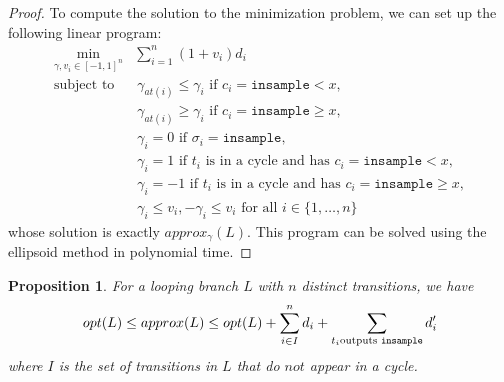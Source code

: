 \documentclass[12pt]{article}
\newcommand{\gguard}[1][x]{\texttt{insample}\geq #1}
\newcommand{\lguard}[1][x]{\texttt{insample} < #1}
\newtheorem{prop}[thm]{Proposition}
\theoremstyle{definition}
\begin{document}
\begin{proof}
    To compute the solution to the minimization problem, we can set up the following linear program: 
    \begin{align*}
        \min_{\gamma, v_i \in [-1, 1]^n} &\sum_{i = 1}^n \left(1 + v_i \right) d_i \\ 
            \text{subject to } 
            &\ \gamma_{at(i)} \leq \gamma_i \text{ if } c_i = \lguard, \\
            &\ \gamma_{at(i)} \geq \gamma_i \text{ if } c_i = \gguard, \\
            &\ \gamma_i = 0 \text{ if } \sigma_i = \texttt{insample}, \\
            &\ \gamma_i = 1 \text{ if } t_i \text{ is in a cycle and has } c_i = \lguard,\\ 
            &\ \gamma_i = -1 \text{ if } t_i \text{ is in a cycle and has } c_i = \gguard,\\
            &\ \gamma_i \leq v_i, -\gamma_i \leq v_i \text{ for all } i \in \{1, \dots, n\} 
    \end{align*}
    whose solution is exactly $approx_\gamma(L)$. This program can be solved using the ellipsoid method in polynomial time.
\end{proof}

\begin{prop}
    For a looping branch $L$ with $n$ distinct transitions, we have 
    \[opt(L) \leq approx(L) \leq opt(L) + \sum_{i \in I }^n d_i + \sum_{t_i \text{outputs \texttt{insample}}} d_i'\]
    where $I$ is the set of transitions in $L$ that do $\textit{not}$ appear in a cycle.
\end{prop}
\end{document}
